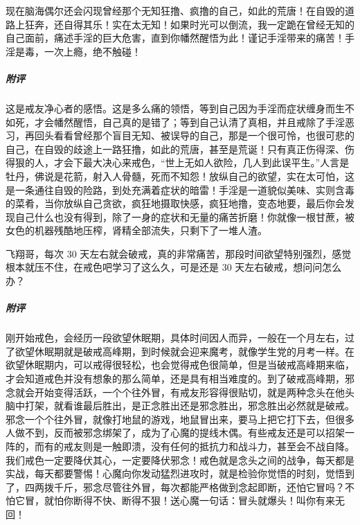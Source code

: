 \begin{case}
    现在脑海偶尔还会闪现曾经那个无知狂撸、疯撸的自己，如此的荒唐！在自毁的道路上狂奔，还自得其乐！实在太无知！如果时光可以倒流，我一定跪在曾经无知的自己面前，痛述手淫的巨大危害，直到你幡然醒悟为此！谨记手淫带来的痛苦！手淫是毒，一次上瘾，绝不触碰！
    \subparagraph{附评} 这是戒友净心者的感悟。这是多么痛的领悟，等到自己因为手淫而症状缠身而生不如死，才会幡然醒悟，自己真的是错了；等到自己认清了真相，并且戒除了手淫恶习，再回头看看曾经那个盲目无知、被误导的自己，那是一个很可怜，也很可悲的自己，在自毁的歧途上一路狂撸，如此的荒唐，甚至是荒诞！只有真正伤得深、伤得狠的人，才会下最大决心来戒色，“世上无如人欲险，几人到此误平生。”人言是牡丹，佛说是花箭，射入人骨髓，死而不知怨！放纵自己的欲望，实在太可怕，这是一条通往自毁的险路，到处充满着症状的暗雷！手淫是一道貌似美味、实则含毒的菜肴，当你放纵自己贪欲，疯狂地摄取快感，疯狂地撸，变态地要，最后你会发现自己什么也没有得到，除了一身的症状和无量的痛苦折磨！你就像一根甘蔗，被女色的机器残酷地压榨，肾精全部流失，只剩下了一堆人渣。
\end{case}

\begin{case}
    飞翔哥，每次 30 天左右就会破戒，真的非常痛苦，那段时间欲望特别强烈，感觉根本就压不住，在戒色吧学习了这么久，可是还是 30 天左右破戒，想问问怎么办？
    \subparagraph{附评} 刚开始戒色，会经历一段欲望休眠期，具体时间因人而异，一般在一个月左右，过了欲望休眠期就是破戒高峰期，到时候就会迎来魔考，就像学生党的月考一样。在欲望休眠期内，可以戒得很轻松，也会觉得戒色很简单，但是当破戒高峰期来临，才会知道戒色并没有想象的那么简单，还是具有相当难度的。到了破戒高峰期，邪念就会开始变得活跃，一个个往外冒，有戒友形容得很贴切，就是两种念头在他头脑中打架，就看谁最后胜出，是正念胜出还是邪念胜出，邪念胜出必然就是破戒。邪念一个个往外冒，就像打地鼠的游戏，地鼠冒出来，要马上把它打下去，但很多人做不到，反而被邪念绑架了，成为了心魔的提线木偶。有些戒友还是可以招架一阵的，而有的戒友则是一触即溃，没有任何的抵抗力和战斗力，甚至会不战自降。我们戒色一定要降伏其心，一定要降伏邪念！戒色就是念头之间的战争，每天都是实战，每天都要警惕！心魔向你发动猛烈进攻时，就是检验你觉悟的时刻，觉悟到了，四两拨千斤，邪念尽管往外冒，每次都能严格做到念起即断，还怕它冒吗？不怕它冒，就怕你断得不快、断得不狠！送心魔一句话：冒头就爆头！叫你有来无回！
\end{case}

